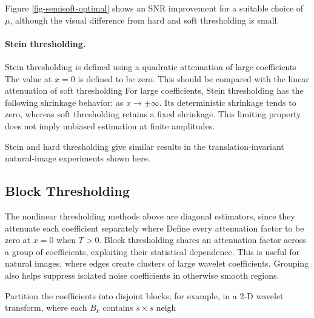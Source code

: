 Figure \ref{fig-semisoft-optimal} shows an SNR improvement for a suitable choice of $\mu$, although the visual difference from hard and soft thresholding is small.


  
\paragraph{Stein thresholding.}

Stein thresholding is defined using a quadratic attenuation of large coefficients
The value at $x=0$ is defined to be zero. This should be compared with the linear attenuation of soft thresholding
For large coefficients, Stein thresholding has the following shrinkage behavior:
as $x \rightarrow \pm \infty$. Its deterministic shrinkage tends to zero, whereas soft thresholding retains a fixed shrinkage. This limiting property does not imply unbiased estimation at finite amplitudes.


Stein and hard thresholding give similar results in the translation-invariant natural-image experiments shown here.

                                                     
\subsection{Block Thresholding}

The nonlinear thresholding methods above are diagonal estimators, since they attenuate each coefficient separately
where 
Define every attenuation factor to be zero at $x=0$ when $T>0$. Block thresholding shares an attenuation factor across a group of coefficients, exploiting their statistical dependence. This is useful for natural images, where edges create clusters of large wavelet coefficients. Grouping also helps suppress isolated noise coefficients in otherwise smooth regions.

Partition the coefficients into disjoint blocks; for example, in a 2-D wavelet transform,
where each $B_k$ contains $s\times s$ neigh